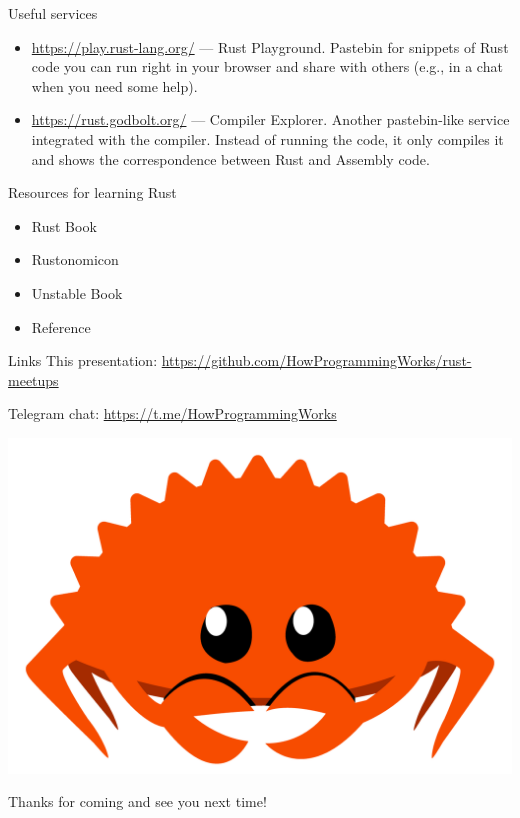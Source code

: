 \documentclass[12pt, aspectratio=169]{beamer}
\newcommand{\ferrisframe}[1]{%
  \begin{frame}[standout]
    \includegraphics[height=0.8\textheight]{images/ferris.png}

    #1
  \end{frame}
}
\begin{document}
\begin{frame}{Useful services}
  \begin{itemize}
    \item \url{https://play.rust-lang.org/} --- Rust Playground. Pastebin for
      snippets of Rust code you can run right in your browser and share with
      others (e.g., in a chat when you need some help).
    \item \url{https://rust.godbolt.org/} --- Compiler Explorer. Another
      pastebin-like service integrated with the compiler. Instead of running
      the code, it only compiles it and shows the correspondence between Rust
      and Assembly code.
  \end{itemize}
\end{frame}

\begin{frame}{Resources for learning Rust}
  \begin{itemize}
    \item Rust Book 
    \item Rustonomicon 
    \item Unstable Book 
    \item Reference 
  \end{itemize}
\end{frame}

\begin{frame}{Links}
  This presentation: \url{https://github.com/HowProgrammingWorks/rust-meetups}

  Telegram chat: \url{https://t.me/HowProgrammingWorks}
\end{frame}

\ferrisframe{Thanks for coming and see you next time!}
\end{document}
